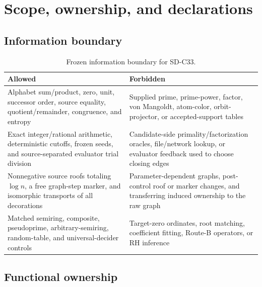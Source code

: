 \section{Scope, ownership, and declarations}
\label{app:scope}

\subsection{Information boundary}

\begin{table}[H]
\centering
\caption{Frozen information boundary for SD-C33.}
\label{tab:information-boundary}
\small
\begin{tabularx}{\textwidth}{@{}Y Y@{}}
\toprule
Allowed & Forbidden \\
\midrule
Alphabet sum/product, zero, unit, successor order, source equality, quotient/remainder, congruence, and entropy
& Supplied prime, prime-power, factor, von Mangoldt, atom-color, orbit-projector, or accepted-support tables \\
Exact integer/rational arithmetic, deterministic cutoffs, frozen seeds, and source-separated evaluator trial division
& Candidate-side primality/factorization oracles, file/network lookup, or evaluator feedback used to choose closing edges \\
Nonnegative source roofs totaling $\log n$, a free graph-step marker, and isomorphic transports of all decorations
& Parameter-dependent graphs, post-control roof or marker changes, and transferring induced ownership to the raw graph \\
Matched semiring, composite, pseudoprime, arbitrary-semiring, random-table, and universal-decider controls
& Target-zero ordinates, root matching, coefficient fitting, Route-B operators, or RH inference \\
\bottomrule
\end{tabularx}
\end{table}

\subsection{Functional ownership}

